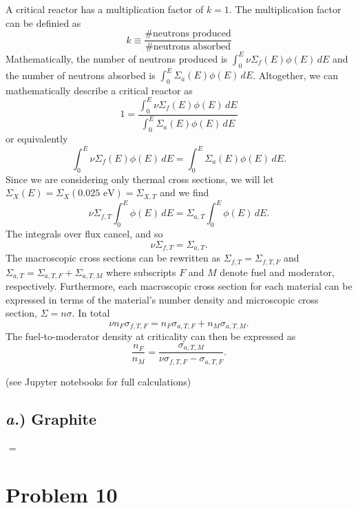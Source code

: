 \documentclass{article}
\begin{document}
A critical reactor has a multiplication factor of $k=1$. The multiplication factor can be definied as
$$ k \equiv \frac{\text{\# neutrons produced}}{\text{\# neutrons absorbed}} $$
Mathematically, the number of neutrons produced is $\int_0^E \nu \Sigma_f(E)\phi(E)\,dE$ and the number of neutrons absorbed is $\int_0^E \Sigma_a(E)\phi(E)\,dE$. Altogether, we can mathematically describe a critical reactor as 
$$ 1 = \frac{\int_0^E \nu \Sigma_f(E)\phi(E)\,dE}{\int_0^E \Sigma_a(E)\phi(E)\,dE} $$
or equivalently
$$ \int_0^E \nu \Sigma_f(E)\phi(E)\,dE = \int_0^E \Sigma_a(E)\phi(E)\,dE. $$
Since we are considering only thermal cross sections, we will let $\Sigma_X(E) = \Sigma_X(0.025\text{ eV}) = \Sigma_{X,T}$ and we find
$$ \nu \Sigma_{f,T} \int_0^E \phi(E)\,dE = \Sigma_{a,T} \int_0^E \phi(E)\,dE. $$
The integrals over flux cancel, and so
$$ \nu \Sigma_{f,T} = \Sigma_{a,T} .$$
The macroscopic cross sections can be rewritten as $\Sigma_{f,T} = \Sigma_{f,T,F}$ and $\Sigma_{a,T} = \Sigma_{a,T,F} + \Sigma_{a,T,M}$ where subscripts $F$ and $M$ denote fuel and moderator, respectively. Furthermore, each macroscopic cross section for each material can be expressed in terms of the material's number density and microscopic cross section, $\Sigma = n\sigma$. In total
$$ \nu n_F \sigma_{f,T,F} = n_F \sigma_{a,T,F} + n_M \sigma_{a,T,M} .$$
The fuel-to-moderator density at criticality can then be expressed as
$$ \frac{n_F}{n_M} = \frac{\sigma_{a,T,M}}{\nu \sigma_{f,T,F} - \sigma_{a,T,F}} .$$

(see Jupyter notebooks for full calculations)

\subsection*{\textit{a.}) \normalsize Graphite}
$$  = 






\section*{Problem 10}
\end{document}
